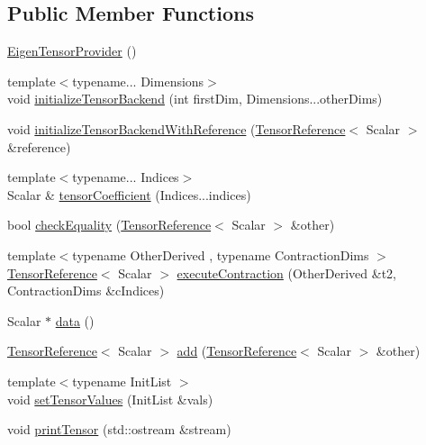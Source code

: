 \subsection*{Public Member Functions}
\begin{DoxyCompactItemize}
\item 
\hyperlink{a00084_a666937cbdec96978bdd47132a95ab9e6}{Eigen\+Tensor\+Provider} ()
\item 
{\footnotesize template$<$typename... Dimensions$>$ }\\void \hyperlink{a00084_a2d624402c063c0398f018417aae2fe28}{initialize\+Tensor\+Backend} (int first\+Dim, Dimensions...\+other\+Dims)
\item 
void \hyperlink{a00084_a284d6bb6a8539c5776e00d2a377d188e}{initialize\+Tensor\+Backend\+With\+Reference} (\hyperlink{a00822_a1bf491fd1c876e2808648b2fd291e3dd}{Tensor\+Reference}$<$ Scalar $>$ \&reference)
\item 
{\footnotesize template$<$typename... Indices$>$ }\\Scalar \& \hyperlink{a00084_abc61cda0193bc5f5d7fcf17ff8e96d82}{tensor\+Coefficient} (Indices...\+indices)
\item 
bool \hyperlink{a00084_a3e15190363627f4c6b373dc56dd2b4f3}{check\+Equality} (\hyperlink{a00822_a1bf491fd1c876e2808648b2fd291e3dd}{Tensor\+Reference}$<$ Scalar $>$ \&other)
\item 
{\footnotesize template$<$typename Other\+Derived , typename Contraction\+Dims $>$ }\\\hyperlink{a00822_a1bf491fd1c876e2808648b2fd291e3dd}{Tensor\+Reference}$<$ Scalar $>$ \hyperlink{a00084_acd9f39dacb5fd6c35f3f840ed22194e9}{execute\+Contraction} (Other\+Derived \&t2, Contraction\+Dims \&c\+Indices)
\item 
Scalar $\ast$ \hyperlink{a00084_aff5626be9e55f593f0a6b71174ecbd8a}{data} ()
\item 
\hyperlink{a00822_a1bf491fd1c876e2808648b2fd291e3dd}{Tensor\+Reference}$<$ Scalar $>$ \hyperlink{a00084_a957d54e0259b1ea798a47389af4b8379}{add} (\hyperlink{a00822_a1bf491fd1c876e2808648b2fd291e3dd}{Tensor\+Reference}$<$ Scalar $>$ \&other)
\item 
{\footnotesize template$<$typename Init\+List $>$ }\\void \hyperlink{a00084_a3d02dbf7e2d255a1378084aa6459cf25}{set\+Tensor\+Values} (Init\+List \&vals)
\item 
void \hyperlink{a00084_a607ad28d9f0b8b7f639dc1b0693dfd03}{print\+Tensor} (std\+::ostream \&stream)
\item 

\end{DoxyCompactItemize}
